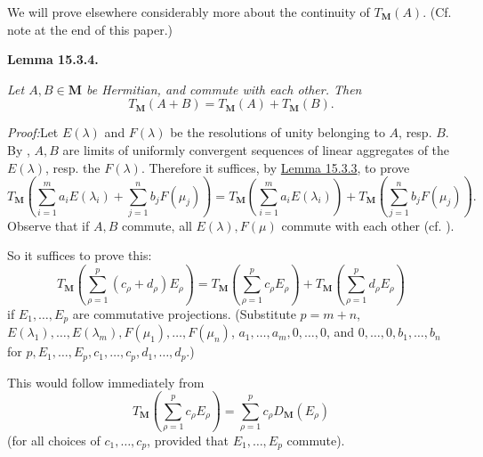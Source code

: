 \documentclass[12pt,b5paper,twoside]{article}
\newcommand{\M}{\mathbf M}
\newcommand{\Lemma}[1]{%
  \par\smallskip\noindent\phantomsection\label{lem:#1}\textbf{Lemma #1.}\enspace
}
\newcommand{\Proof}{\par\noindent\textit{Proof:}\enspace}
\newcommand{\lemref}[1]{\hyperref[lem:#1]{Lemma #1}}
\begin{document}
We will prove elsewhere considerably more about the continuity of
\(T_{\M}(A)\). (Cf. note at the end of this paper.)

\Lemma{15.3.4}
{\itshape Let \(A,B\in\M\) be Hermitian, and commute with each other. Then
\[
T_{\M}(A+B)=T_{\M}(A)+T_{\M}(B).
\]}

\Proof Let \(E(\lambda)\) and \(F(\lambda)\) be the resolutions of unity
belonging to \(A\), resp. \(B\). By
\cite[pp.~390--391, in particular footnote~43]{ref18}, \(A,B\) are limits of
uniformly convergent sequences of linear aggregates of the \(E(\lambda)\),
resp. the \(F(\lambda)\). Therefore it suffices, by \lemref{15.3.3}, to prove
\[
T_{\M}\left(\sum_{i=1}^{m} a_iE(\lambda_i)
 +\sum_{j=1}^{n}b_jF(\mu_j)\right)
=T_{\M}\left(\sum_{i=1}^{m} a_iE(\lambda_i)\right)
 +T_{\M}\left(\sum_{j=1}^{n}b_jF(\mu_j)\right).
\]
Observe that if \(A,B\) commute, all \(E(\lambda),F(\mu)\) commute with
each other (cf. \cite[p.~115]{ref16}).

So it suffices to prove this:
\[
T_{\M}\left(\sum_{\rho=1}^p(c_\rho+d_\rho)E_\rho\right)
=T_{\M}\left(\sum_{\rho=1}^pc_\rho E_\rho\right)
 +T_{\M}\left(\sum_{\rho=1}^pd_\rho E_\rho\right)
\]
if \(E_1,\ldots,E_p\) are commutative projections. (Substitute
\(p=m+n\), \(E(\lambda_1),\ldots,E(\lambda_m),\allowbreak F(\mu_1),\ldots,F(\mu_n)\),
\(a_1,\ldots,a_m,0,\ldots,0\), and
\(0,\ldots,0,b_1,\ldots,b_n\) for
\(p,\allowbreak E_1,\ldots,E_p,\allowbreak c_1,\ldots,c_p,
\allowbreak d_1,\ldots,d_p\).)

This would follow immediately from
\begin{equation*}
 T_{\M}\left(\sum_{\rho=1}^pc_\rho E_\rho\right)
=\sum_{\rho=1}^pc_\rho D_{\M}(E_\rho)
\tag{\#}\label{eq:15.3-hash}
\end{equation*}
(for all choices of \(c_1,\ldots,c_p\), provided that
\(E_1,\ldots,E_p\) commute).
\end{document}
